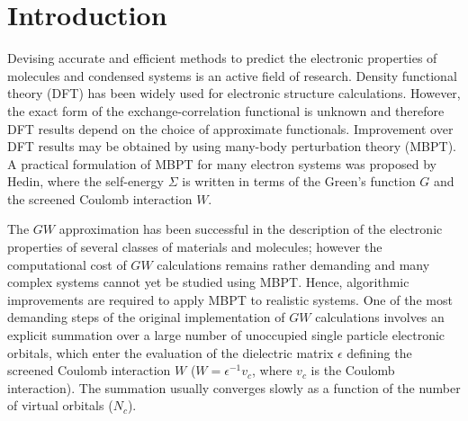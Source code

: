 \documentclass[aip,preprint]{revtex4-1}
\begin{document}
\maketitle %

\section{\label{sec:introduction}Introduction}
	Devising accurate and efficient methods to predict the electronic properties of molecules and condensed systems is an active field of research. Density functional theory (DFT) has been widely used for electronic structure calculations.\cite{DFT1964,DFT1965,DFT2004} However, the exact form of the exchange-correlation functional is unknown and therefore DFT results depend on the choice of approximate functionals. Improvement over DFT results may be obtained by using many-body perturbation theory (MBPT).\cite{ReiningMBPT,martin2016InteractingElectrons} A practical formulation of MBPT for many electron systems was proposed by Hedin,\cite{hedin1965} where the self-energy $\Sigma$ is written in terms of the Green's function $G$ and the screened Coulomb interaction $W$.

	The  $GW$ approximation\cite{hedin1965,martin2016InteractingElectrons} has been successful in the description of the electronic properties of several classes of materials and molecules;\cite{OriginalGW100,GW100-maggio2017,Marco2018,peter2016JCTC,brawand2016generalization,golze2019gw-compendium} however the computational cost of $GW$ calculations remains rather demanding and many complex systems cannot yet be studied using MBPT. Hence, algorithmic improvements are required to apply MBPT to realistic systems. One of the most demanding steps of the original implementation of $GW$ calculations\cite{Louie1985PRL,Louie1985PRB,Louie1986,Strinati1980GWImplementation,Strinati1982GWImplementation} involves an explicit summation over a large number of unoccupied single particle electronic orbitals, which enter the evaluation of the dielectric matrix $\epsilon$\cite{adler1962quantum,wiser1963dielectric} defining the screened Coulomb interaction $W$ ($W=\epsilon^{-1}v_c$, where $v_c$ is the Coulomb interaction). The summation usually converges slowly as a function of the number of virtual orbitals ($N_c$). 
\end{document}
